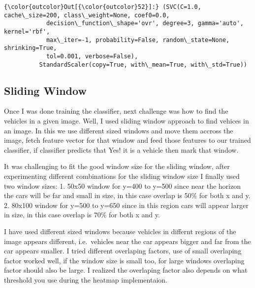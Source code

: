 \documentclass[11pt]{article}
\begin{document}
\begin{Verbatim}[commandchars=\\\{\}]
{\color{outcolor}Out[{\color{outcolor}52}]:} (SVC(C=1.0, cache\_size=200, class\_weight=None, coef0=0.0,
            decision\_function\_shape='ovr', degree=3, gamma='auto', kernel='rbf',
            max\_iter=-1, probability=False, random\_state=None, shrinking=True,
            tol=0.001, verbose=False),
          StandardScaler(copy=True, with\_mean=True, with\_std=True))
\end{Verbatim}
            
    \hypertarget{sliding-window}{%
\subsection{Sliding Window}\label{sliding-window}}

Once I was done training the classifier, next challenge was how to find
the vehicles in a given image. Well, I used sliding window approach to
find vehices in an image. In this we use different sized windows and
move them accross the image, fetch feature vector for that window and
feed those features to our trained classifier, if classifier predicts
that Yes! it is a vehicle then mark that window.

It was challenging to fit the good window size for the sliding window,
after experimenting different combinations for the sliding window size I
finally used two window sizes: 1. 50x50 window for y=400 to y=500 since
near the horizon the cars will be far and small in size, in this case
overlap is 50\% for both x and y. 2. 80x100 window for y=500 to y=650
since in this region cars will appear larger in size, in this case
overlap is 70\% for both x and y.

I have used different sized windows because vehicles in differnt regions
of the image appears different, i.e.~vehicles near the car appears
bigger and far from the car appears smaller. I tried different
overlaping factors, use of small overlaping factor worked well, if the
window size is small too, for large windows overlaping factor should
also be large. I realized the overlaping factor also depends on what
threshold you use during the heatmap implementaion.
\end{document}

